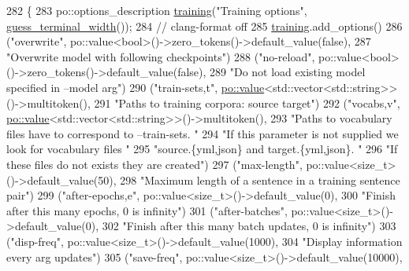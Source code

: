 \begin{DoxyCode}
282                                                                  \{
283   po::options\_description \hyperlink{namespacemarian_aaddd4b008ff5352b1fe7e16574f7e1f9ac185ddac8b5a8f5aa23c5b80bc12d214}{training}(\textcolor{stringliteral}{"Training options"}, 
      \hyperlink{namespacemarian_aa656da9ccb3e53462fef9b9745616b57}{guess\_terminal\_width}());
284   \textcolor{comment}{// clang-format off}
285   \hyperlink{namespacemarian_aaddd4b008ff5352b1fe7e16574f7e1f9ac185ddac8b5a8f5aa23c5b80bc12d214}{training}.add\_options()
286     (\textcolor{stringliteral}{"overwrite"}, po::value<bool>()->zero\_tokens()->default\_value(\textcolor{keyword}{false}),
287       \textcolor{stringliteral}{"Overwrite model with following checkpoints"})
288     (\textcolor{stringliteral}{"no-reload"}, po::value<bool>()->zero\_tokens()->default\_value(\textcolor{keyword}{false}),
289       \textcolor{stringliteral}{"Do not load existing model specified in --model arg"})
290     (\textcolor{stringliteral}{"train-sets,t"}, \hyperlink{namespacemarian_1_1keywords_ac70de1b4c3cf6b7080cf5086f2963fd8}{po::value}<std::vector<std::string>>()->multitoken(),
291       \textcolor{stringliteral}{"Paths to training corpora: source target"})
292     (\textcolor{stringliteral}{"vocabs,v"}, \hyperlink{namespacemarian_1_1keywords_ac70de1b4c3cf6b7080cf5086f2963fd8}{po::value}<std::vector<std::string>>()->multitoken(),
293       \textcolor{stringliteral}{"Paths to vocabulary files have to correspond to --train-sets. "}
294       \textcolor{stringliteral}{"If this parameter is not supplied we look for vocabulary files "}
295       \textcolor{stringliteral}{"source.\{yml,json\} and target.\{yml,json\}. "}
296       \textcolor{stringliteral}{"If these files do not exists they are created"})
297     (\textcolor{stringliteral}{"max-length"}, po::value<size\_t>()->default\_value(50),
298       \textcolor{stringliteral}{"Maximum length of a sentence in a training sentence pair"})
299     (\textcolor{stringliteral}{"after-epochs,e"}, po::value<size\_t>()->default\_value(0),
300       \textcolor{stringliteral}{"Finish after this many epochs, 0 is infinity"})
301     (\textcolor{stringliteral}{"after-batches"}, po::value<size\_t>()->default\_value(0),
302       \textcolor{stringliteral}{"Finish after this many batch updates, 0 is infinity"})
303     (\textcolor{stringliteral}{"disp-freq"}, po::value<size\_t>()->default\_value(1000),
304       \textcolor{stringliteral}{"Display information every  arg  updates"})
305     (\textcolor{stringliteral}{"save-freq"}, po::value<size\_t>()->default\_value(10000),

\end{DoxyCode}
